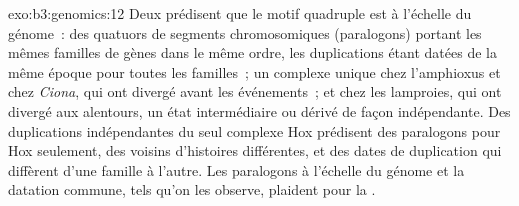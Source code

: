 \begin{solution}{exo:b3:genomics:12}
Deux  prédisent que le motif quadruple est
à l'échelle du génome~: des quatuors de segments chromosomiques
 (paralogons) portant les mêmes familles de gènes dans le même
ordre, les duplications étant datées de la même époque pour toutes les
familles~; un complexe unique chez l'amphioxus et chez \emph{Ciona}, qui
ont divergé avant les événements~; et chez les lamproies, qui ont
divergé aux alentours, un état intermédiaire ou dérivé de façon
indépendante. Des duplications indépendantes du seul complexe Hox
prédisent des paralogons pour Hox seulement, des voisins d'histoires
différentes, et des dates de duplication qui diffèrent d'une famille à
l'autre. Les paralogons à l'échelle du génome et la datation commune,
tels qu'on les observe, plaident pour la .
\end{solution}


